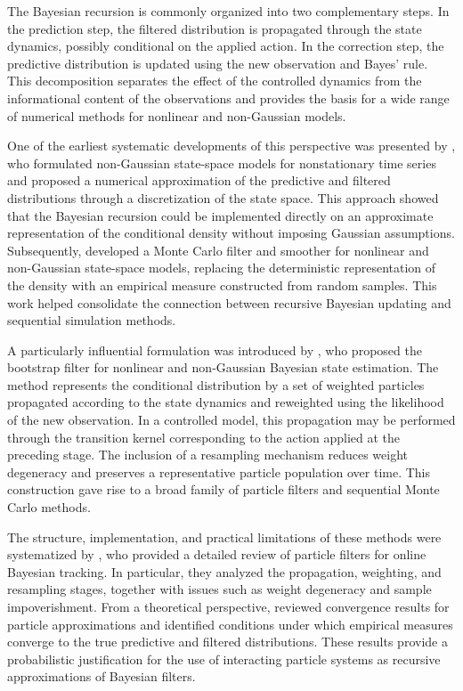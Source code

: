 \documentclass[10pt,twocolumn]{article}
\theoremstyle{remark}
\begin{document}
The Bayesian recursion is commonly organized into two complementary steps. In the prediction step, the filtered distribution is propagated through the state dynamics, possibly conditional on the applied action. In the correction step, the predictive distribution is updated using the new observation and Bayes' rule. This decomposition separates the effect of the controlled dynamics from the informational content of the observations and provides the basis for a wide range of numerical methods for nonlinear and non-Gaussian models.

One of the earliest systematic developments of this perspective was presented by \citet{Kitagawa1987NonGaussianStateSpace}, who formulated non-Gaussian state-space models for nonstationary time series and proposed a numerical approximation of the predictive and filtered distributions through a discretization of the state space. This approach showed that the Bayesian recursion could be implemented directly on an approximate representation of the conditional density without imposing Gaussian assumptions. Subsequently, \citet{Kitagawa1996MonteCarloFilter} developed a Monte Carlo filter and smoother for nonlinear and non-Gaussian state-space models, replacing the deterministic representation of the density with an empirical measure constructed from random samples. This work helped consolidate the connection between recursive Bayesian updating and sequential simulation methods.

A particularly influential formulation was introduced by \citet{GordonSalmondSmith1993BayesianStateEstimation}, who proposed the bootstrap filter for nonlinear and non-Gaussian Bayesian state estimation. The method represents the conditional distribution by a set of weighted particles propagated according to the state dynamics and reweighted using the likelihood of the new observation. In a controlled model, this propagation may be performed through the transition kernel corresponding to the action applied at the preceding stage. The inclusion of a resampling mechanism reduces weight degeneracy and preserves a representative particle population over time. This construction gave rise to a broad family of particle filters and sequential Monte Carlo methods.

The structure, implementation, and practical limitations of these methods were systematized by \citet{ArulampalamMaskellGordonClapp2002ParticleFilters}, who provided a detailed review of particle filters for online Bayesian tracking. In particular, they analyzed the propagation, weighting, and resampling stages, together with issues such as weight degeneracy and sample impoverishment. From a theoretical perspective, \citet{CrisanDoucet2002ParticleFilteringConvergence} reviewed convergence results for particle approximations and identified conditions under which empirical measures converge to the true predictive and filtered distributions. These results provide a probabilistic justification for the use of interacting particle systems as recursive approximations of Bayesian filters.
\end{document}
